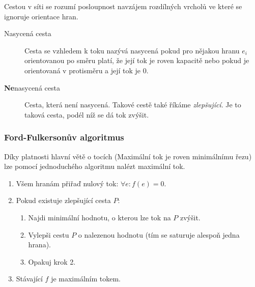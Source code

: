 Cestou v síti se rozumí posloupnost navzájem rozdílných vrcholů ve které se ignoruje orientace hran.

\begin{description}
    \item[Nasycená cesta] Cesta se vzhledem k toku nazývá nasycená pokud pro nějakou hranu $e_i$ orientovanou po směru platí, že její tok je roven kapacitě nebo pokud je orientovaná v protisměru a její tok je $0$.
    \item[\textbf{Ne}nasycená cesta] Cesta, která není nasycená.
    Takové cestě také říkáme \textit{zlepšující}.
    Je to taková cesta, podél níž se dá tok zvýšit.
\end{description}


\subsubsection{Ford-Fulkersonův algoritmus}

Díky platnosti hlavní větě o tocích (Maximální tok je roven minimálnímu řezu) lze pomocí jednoduchého algoritmu nalézt maximální tok.

\begin{enumerate}
    \item Všem hranám přiřaď nulový tok: $\forall e: f(e) = 0$.
    \item Pokud existuje zlepšující cesta $P$:
    \begin{enumerate}
        \item Najdi minimální hodnotu, o kterou lze tok na $P$ zvýšit.
        \item Vylepši cestu $P$ o nalezenou hodnotu (tím se saturuje alespoň jedna hrana).
        \item Opakuj krok 2.
    \end{enumerate}
    \item Stávající $f$ je maximálním tokem.
\end{enumerate}
